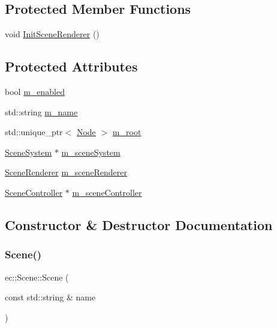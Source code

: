 \subsection*{Protected Member Functions}
\begin{DoxyCompactItemize}
\item 
void \mbox{\hyperlink{classec_1_1_scene_a37c25b9ccec318568e9028be616305c4}{Init\+Scene\+Renderer}} ()
\end{DoxyCompactItemize}
\subsection*{Protected Attributes}
\begin{DoxyCompactItemize}
\item 
bool \mbox{\hyperlink{classec_1_1_scene_ad68ba7af20ecfbc45ee136842a38ccfe}{m\+\_\+enabled}}
\item 
std\+::string \mbox{\hyperlink{classec_1_1_scene_a58a25f1f2370535750e341085ddfd95b}{m\+\_\+name}}
\item 
std\+::unique\+\_\+ptr$<$ \mbox{\hyperlink{classec_1_1_node}{Node}} $>$ \mbox{\hyperlink{classec_1_1_scene_a7b7f1f4840087d56148e4c4be5737b50}{m\+\_\+root}}
\item 
\mbox{\hyperlink{classec_1_1_scene_system}{Scene\+System}} $\ast$ \mbox{\hyperlink{classec_1_1_scene_ad63e472baf8e283c596891384ea98aad}{m\+\_\+scene\+System}}
\item 
\mbox{\hyperlink{classec_1_1_scene_renderer}{Scene\+Renderer}} \mbox{\hyperlink{classec_1_1_scene_a17a2c241cec6bda0a5895b353aa28fa7}{m\+\_\+scene\+Renderer}}
\item 
\mbox{\hyperlink{classec_1_1_scene_controller}{Scene\+Controller}} $\ast$ \mbox{\hyperlink{classec_1_1_scene_aa6a8f71066fc44162b1c80341840d5fb}{m\+\_\+scene\+Controller}}
\end{DoxyCompactItemize}


\subsection{Constructor \& Destructor Documentation}
\mbox{\label{classec_1_1_scene_ad137e70b44b44f22b3e68d50671e9989}} 
\subsubsection{\texorpdfstring{Scene()}{Scene()}}
{\footnotesize\ttfamily ec\+::\+Scene\+::\+Scene (\begin{DoxyParamCaption}\item[{const std\+::string \&}]{name }\end{DoxyParamCaption})\hspace{0.3cm}{\ttfamily [explicit]}}

